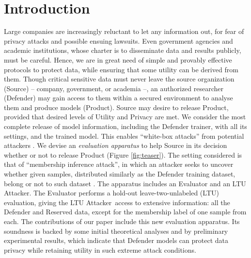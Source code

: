 \documentclass[letterpaper]{article}
\newcommand{\oracle}{LTU Attacker~}
\begin{document}

\section{Introduction}

    Large companies are increasingly reluctant to let any information out, for fear of privacy attacks and possible ensuing lawsuits. Even government agencies and academic institutions, whose charter is to disseminate data and results publicly, must be careful. Hence, we are in great need of simple and provably effective protocols to protect data, while ensuring that some utility can be derived from them. Though critical sensitive data must never leave the source organization (Source) -- company, government, or academia --, an authorized researcher (Defender) may gain access to them within a secured environment to analyse them and produce models (Product). Source may desire to release Product, provided that desired levels of Utility and Privacy are met.  We consider the most complete release of model information, including the Defender trainer, with all its settings, and the trained model. This enables ``white-box attacks'' from potential attackers \cite{nasr2019comprehensive}. 
    We devise an {\em evaluation apparatus} to help Source in its decision whether or not to release Product (Figure \ref{fig:teaser}). The setting considered is that of ``membership inference attack'', in which an attacker seeks to uncover whether given samples, distributed similarly as the Defender training dataset, belong or not to such dataset \cite{shokri2017membership}.
    The apparatus includes an Evaluator and an LTU Attacker. The Evaluator performs a hold-out leave-two-unlabeled (LTU) evaluation, giving the \oracle access to extensive information: all the Defender and Reserved data, except for the membership label of one sample from each. The contributions of our paper include this new evaluation apparatus. Its soundness is backed by some initial theoretical analyses and by preliminary experimental results, which indicate that Defender models can protect data privacy while retaining utility in such extreme attack conditions.
    
    
\end{document}
